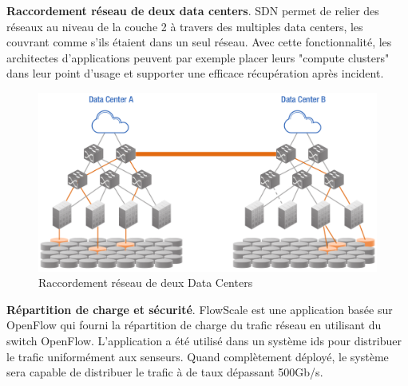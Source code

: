 \textbf{Raccordement réseau de deux data centers}. SDN permet de relier des réseaux au niveau de la couche 2 à travers des multiples data centers, les couvrant comme s'ils étaient dans un seul réseau. Avec cette fonctionnalité, les architectes d'applications peuvent par exemple placer leurs "compute clusters" dans leur point d'usage et supporter une efficace récupération après incident. \cite{ODCAusageScenarios}

\begin{figure}[!h] %
\includegraphics[width=15cm]{images/DataCenterL2Bridging.png} %
\caption{ Raccordement réseau de deux Data Centers \cite{ODCAusageScenarios}} %
\label{imgDCL2B} %
\end{figure} %

\textbf{Répartition de charge et sécurité}. FlowScale est une application basée sur OpenFlow qui fourni la répartition de charge du trafic réseau en utilisant du switch OpenFlow. L'application a été utilisé dans un système \gls{ids} pour distribuer le trafic uniformément aux senseurs. Quand complètement déployé, le système sera capable de distribuer le trafic à de taux dépassant 500Gb/s.  \cite{FlowScale}

